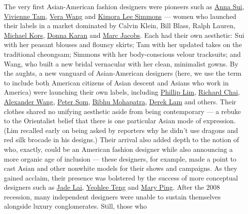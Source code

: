 The very first Asian-American fashion designers were pioneers such as
\href{https://www.nytimes3xbfgragh.onion/2017/05/11/t-magazine/fashion/anna-sui-profile-style.html}{Anna
Sui}, \href{https://www.viviennetam.com/}{Vivienne Tam},
\href{https://www.verawang.com/}{Vera Wang} and
\href{https://babyphat.com/}{Kimora Lee Simmons} --- women who launched
their labels in a market dominated by Calvin Klein, Bill Blass, Ralph
Lauren,
\href{https://www.nytimes3xbfgragh.onion/2018/04/09/t-magazine/michael-kors-80s-photos-inspiration.html}{Michael
Kors},
\href{https://www.nytimes3xbfgragh.onion/topic/person/donna-karan}{Donna
Karan} and
\href{https://www.nytimes3xbfgragh.onion/2020/02/10/t-magazine/marc-jacobs.html}{Marc
Jacobs}. Each had their own aesthetic: Sui with her peasant blouses and
flouncy skirts; Tam with her updated takes on the traditional cheongsam;
Simmons with her body-conscious velour tracksuits; and Wang, who built a
new bridal vernacular with her clean, minimalist gowns. By the aughts, a
new vanguard of Asian-American designers (here, we use the term to
include both American citizens of Asian descent and Asians who work in
America) were launching their own labels, including
\href{https://www.nytimes3xbfgragh.onion/2020/01/24/t-magazine/phillip-lim-shrimp-recipe.html}{Phillip
Lim}, \href{https://www.instagram.com/richardchai/?hl=en}{Richard Chai},
\href{https://www.alexanderwang.com/us-en/}{Alexander Wang},
\href{https://www.petersom.com/}{Peter Som},
\href{https://www.bibhu.com/}{Bibhu Mohapatra},
\href{https://www.dereklam.com/us}{Derek Lam} and others. Their clothes
shared no unifying aesthetic aside from being contemporary --- a rebuke
to the Orientalist belief that there is one particular Asian mode of
expression. (Lim recalled early on being asked by reporters why he
didn't use dragons and red silk brocade in his designs.) Their arrival
also added depth to the notion of who, exactly, could be an American
fashion designer while also announcing a more organic age of inclusion
--- these designers, for example, made a point to cast Asian and other
nonwhite models for their shows and campaigns. As they gained acclaim,
their presence was bolstered by the success of more conceptual designers
such as \href{https://www.instagram.com/lilmingling/?hl=en}{Jade Lai},
\href{https://yeohlee.com/}{Yeohlee Teng} and
\href{https://tmagazine.blogs.nytimes3xbfgragh.onion/2014/05/20/perfect-pairing-collaboration-sculptural-jewelry-mary-ping-piece-a-conviction/}{Mary
Ping}. After the 2008 recession, many independent designers were unable
to sustain themselves alongside luxury conglomerates. Still, those who
